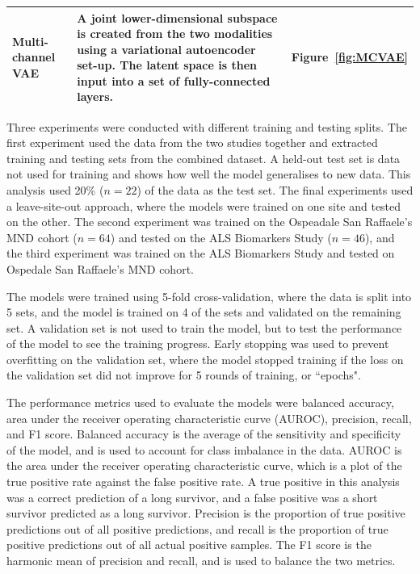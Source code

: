 \begin{table}
\begin{tabular}{|p{4cm}|p{7cm}|l|}
Multi-channel VAE~\cite{antelmiSparseMultiChannelVariational2019} & A joint lower-dimensional subspace is created from the two modalities using a variational autoencoder set-up. The latent space is then input into a set of fully-connected layers. & Figure~\ref{fig:MCVAE} \\ \hline
\end{tabular}
\end{table}

Three experiments were conducted with different training and testing splits.
The first experiment used the data from the two studies together and extracted training and testing sets from the combined dataset.
A held-out test set is data not used for training and shows how well the model generalises to new data.
This analysis used 20\% ($n=22$) of the data as the test set.
The final experiments used a leave-site-out approach, where the models were trained on one site and tested on the other.
The second experiment was trained on the Ospeadale San Raffaele's MND cohort ($n=64$) and tested on the ALS Biomarkers Study ($n=46$), and the third experiment was trained on the ALS Biomarkers Study and tested on Ospedale San Raffaele's MND cohort.

The models were trained using 5-fold cross-validation, where the data is split into 5 sets, and the model is trained on 4 of the sets and validated on the remaining set.
A validation set is not used to train the model, but to test the performance of the model to see the training progress.
Early stopping was used to prevent overfitting on the validation set, where the model stopped training if the loss on the validation set did not improve for 5 rounds of training, or ``epochs".

The performance metrics used to evaluate the models were balanced accuracy, area under the receiver operating characteristic curve (AUROC), precision, recall, and F1 score.
Balanced accuracy is the average of the sensitivity and specificity of the model, and is used to account for class imbalance in the data.
AUROC is the area under the receiver operating characteristic curve, which is a plot of the true positive rate against the false positive rate.
A true positive in this analysis was a correct prediction of a long survivor, and a false positive was a short survivor predicted as a long survivor.
Precision is the proportion of true positive predictions out of all positive predictions, and recall is the proportion of true positive predictions out of all actual positive samples.
The F1 score is the harmonic mean of precision and recall, and is used to balance the two metrics.

